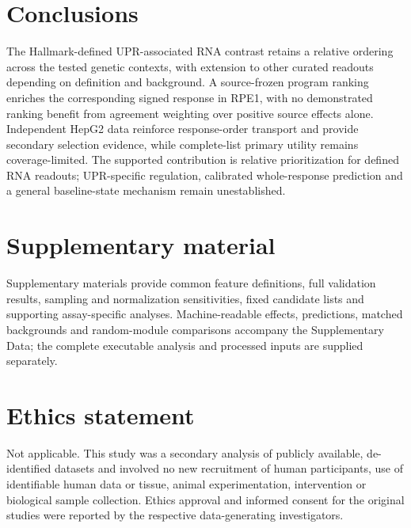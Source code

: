 \documentclass[a4paper,fleqn]{cas-sc}
\makeatletter
\DeclareRobustCommand{\rev}[1]{{\color{red}\def\@citecolor{black}\def\@linkcolor{red}\def\@urlcolor{red}#1}}
\makeatother
\begin{document}
\section{Conclusions}

\rev{The Hallmark-defined UPR-associated RNA contrast retains a relative ordering across the tested genetic contexts, with extension to other curated readouts depending on definition and background.} \rev{A source-frozen program ranking enriches the corresponding signed response in RPE1, with no demonstrated ranking benefit from agreement weighting over positive source effects alone.} \rev{Independent HepG2 data reinforce response-order transport and provide secondary selection evidence, while complete-list primary utility remains coverage-limited.} \rev{The supported contribution is relative prioritization for defined RNA readouts; UPR-specific regulation, calibrated whole-response prediction and a general baseline-state mechanism remain unestablished.}

\section*{Supplementary material}

\rev{Supplementary materials provide common feature definitions, full validation results, sampling and normalization sensitivities, fixed candidate lists and supporting assay-specific analyses.} \rev{Machine-readable effects, predictions, matched backgrounds and random-module comparisons accompany the Supplementary Data; the complete executable analysis and processed inputs are supplied separately.}

\section*{Ethics statement}
Not applicable. This study was a secondary analysis of publicly available, de-identified datasets and involved no new recruitment of human participants, use of identifiable human data or tissue, animal experimentation, intervention or biological sample collection. Ethics approval and informed consent for the original studies were reported by the respective data-generating investigators.
\end{document}
